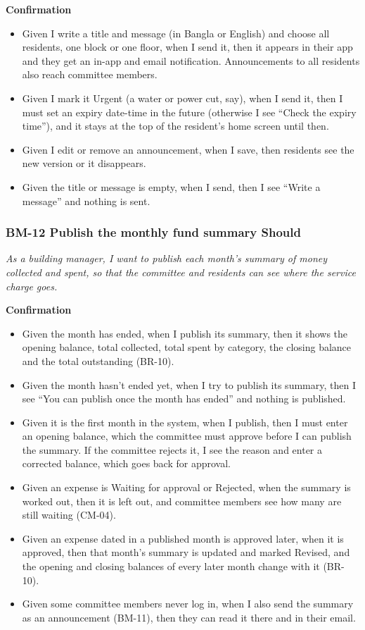 \documentclass[11pt,a4paper]{report}
\begin{document}
\medskip\noindent\textbf{Confirmation}\par

\begin{itemize}
  \item Given I write a title and message (in Bangla or English) and choose all residents, one block or one floor, when I send it, then it appears in their app and they get an in-app and email notification. Announcements to all residents also reach committee members.
  \item Given I mark it Urgent (a water or power cut, say), when I send it, then I must set an expiry date-time in the future (otherwise I see ``Check the expiry time''), and it stays at the top of the resident's home screen until then.
  \item Given I edit or remove an announcement, when I save, then residents see the new version or it disappears.
  \item Given the title or message is empty, when I send, then I see ``Write a message'' and nothing is sent.
\end{itemize}

\subsubsection*{BM-12 \textperiodcentered{} Publish the monthly fund summary \textperiodcentered{} Should}

\emph{As a building manager, I want to publish each month's summary of money collected and spent, so that the committee and residents can see where the service charge goes.}

\medskip\noindent\textbf{Confirmation}\par

\begin{itemize}
  \item Given the month has ended, when I publish its summary, then it shows the opening balance, total collected, total spent by category, the closing balance and the total outstanding (BR-10).
  \item Given the month hasn't ended yet, when I try to publish its summary, then I see ``You can publish once the month has ended'' and nothing is published.
  \item Given it is the first month in the system, when I publish, then I must enter an opening balance, which the committee must approve before I can publish the summary. If the committee rejects it, I see the reason and enter a corrected balance, which goes back for approval.
  \item Given an expense is Waiting for approval or Rejected, when the summary is worked out, then it is left out, and committee members see how many are still waiting (CM-04).
  \item Given an expense dated in a published month is approved later, when it is approved, then that month's summary is updated and marked Revised, and the opening and closing balances of every later month change with it (BR-10).
  \item Given some committee members never log in, when I also send the summary as an announcement (BM-11), then they can read it there and in their email.
\end{itemize}
\end{document}
